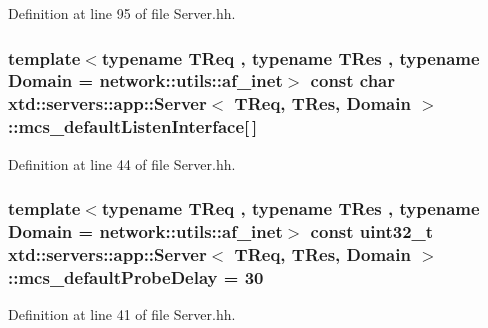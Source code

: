 Definition at line 95 of file Server.\-hh.

\hypertarget{classxtd_1_1servers_1_1app_1_1Server_a9d3ac8218bf47d8ffa6d8b30a6195fa8}{
\subsubsection[{mcs\-\_\-default\-Listen\-Interface}]{\setlength{\rightskip}{0pt plus 5cm}template$<$typename T\-Req , typename T\-Res , typename Domain  = network\-::utils\-::af\-\_\-inet$>$ const char {\bf xtd\-::servers\-::app\-::\-Server}$<$ T\-Req, T\-Res, Domain $>$\-::mcs\-\_\-default\-Listen\-Interface\mbox{[}$\,$\mbox{]}\hspace{0.3cm}{\ttfamily [static]}}}\label{classxtd_1_1servers_1_1app_1_1Server_a9d3ac8218bf47d8ffa6d8b30a6195fa8}


Definition at line 44 of file Server.\-hh.

\hypertarget{classxtd_1_1servers_1_1app_1_1Server_ae361d389bf6050e2565055e7e3800e82}{
\subsubsection[{mcs\-\_\-default\-Probe\-Delay}]{\setlength{\rightskip}{0pt plus 5cm}template$<$typename T\-Req , typename T\-Res , typename Domain  = network\-::utils\-::af\-\_\-inet$>$ const uint32\-\_\-t {\bf xtd\-::servers\-::app\-::\-Server}$<$ T\-Req, T\-Res, Domain $>$\-::mcs\-\_\-default\-Probe\-Delay = 30\hspace{0.3cm}{\ttfamily [static]}}}\label{classxtd_1_1servers_1_1app_1_1Server_ae361d389bf6050e2565055e7e3800e82}


Definition at line 41 of file Server.\-hh.

